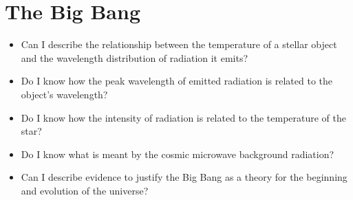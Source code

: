 \section{The Big Bang}
\begin{multicols}{2}
	\begin{itemize}
        \item Can I describe the relationship between the temperature of a
            stellar object and the wavelength distribution of radiation
            it emits?

        \item Do I know how the peak wavelength of emitted radiation is
            related to the object's wavelength?

        \item Do I know how the intensity of radiation is related to the
            temperature of the star?

        \item Do I know what is meant by the cosmic microwave background
            radiation?

        \item Can I describe evidence to justify the Big Bang as a theory for
            the beginning and evolution of the universe?
	\end{itemize}
\end{multicols}
